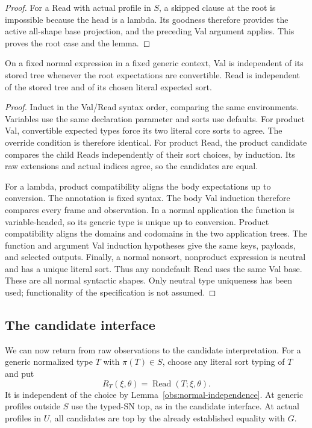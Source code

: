 \begin{proof}
For a Read with actual profile in $S$, a skipped clause at the root is
impossible because the head is a lambda.  Its goodness therefore
provides the active all-shape base projection, and the preceding Val
argument applies.  This proves the root case and the lemma.
\end{proof}

\begin{lemma}\label{obs:normal-independence}
On a fixed normal expression in a fixed generic context, Val is
independent of its stored tree whenever the root expectations are
convertible.  Read is independent of the stored tree and of its chosen
literal expected sort.
\end{lemma}
\begin{proof}
Induct in the Val/Read syntax order, comparing the same environments.
Variables use the same declaration parameter and sorts use defaults.
For product Val, convertible expected types force its two literal core
sorts to agree.  The override condition is therefore identical.  For
product Read, the product candidate compares the child Reads
independently of their sort choices, by induction.  Its raw extensions
and actual indices agree, so the candidates are equal.

For a lambda, product compatibility aligns the body expectations up to
conversion.  The annotation is fixed syntax.  The body Val induction
therefore compares every frame and observation.  In a normal
application the function is variable-headed, so its generic type is
unique up to conversion.  Product compatibility aligns the domains and
codomains in the two application trees.  The function and argument
Val induction hypotheses give the same keys, payloads, and selected
outputs.  Finally, a normal nonsort, nonproduct expression is neutral
and has a unique literal sort.  Thus any nondefault Read uses the same
Val base.  These are all normal syntactic shapes.  Only neutral type
uniqueness has been used; functionality of the specification is not
assumed.
\end{proof}

\subsection{The candidate interface}
\label{obs:interface}

We can now return from raw observations to the candidate interpretation.
For a generic normalized type $T$ with $\pi(T)\in S$, choose any
literal sort typing of $T$ and put
\begin{equation}\label{obs:R-definition}
        R_T(\xi,\theta)=\operatorname{Read}(T;\xi,\theta).
\end{equation}
It is independent of the choice by
Lemma~\ref{obs:normal-independence}.  At generic profiles outside $S$
use the typed-SN top, as in the candidate interface.  At actual
profiles in $U$, all candidates are top by the already established
equality with $G$.

